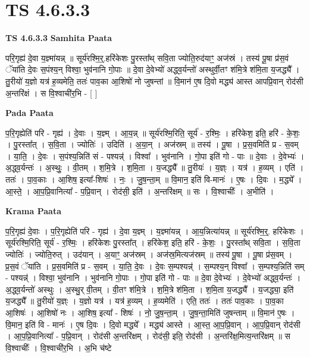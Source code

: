 \documentclass[17pt]{extarticle}
\begin{document}
\section{ TS 4.6.3.3 }

\textbf{TS 4.6.3.3 } \newline
\textbf{Samhita Paata} \newline

परि॒गृह्य॑ दे॒वा य॒ज्ञ्मा॑यन्न् ॥ सूर्य॑रश्मि॒र्॒.हरि॑केशः पु॒रस्ता᳚थ् सवि॒ता ज्योति॒रुद॑याꣳ॒॒ अज॑स्रं । तस्य॑ पू॒षा प्र॑स॒वं ॅया॑ति दे॒वः स॒पंश्य॒न् विश्वा॒ भुव॑नानि गो॒पाः ॥ दे॒वा दे॒वेभ्यो॑ अद्ध्व॒र्यन्तो॑ अस्थुर्वी॒तꣳ श॑मि॒त्रे श॑मि॒ता य॒जद्ध्यै᳚ । तु॒रीयो॑ य॒ज्ञो यत्र॑ ह॒व्यमेति॒ ततः॑ पाव॒का आ॒शिषो॑ नो जुषन्तां ॥ वि॒मान॑ ए॒ष दि॒वो मद्ध्य॑ आस्त आपप्रि॒वान् रोद॑सी अ॒न्तरि॑क्षं । स वि॒श्वाची॑र॒भि - [  ] \newline

\textbf{Pada Paata} \newline

प॒रि॒गृह्येति॑ परि - गृह्य॑ । दे॒वाः । य॒ज्ञ्म् । आ॒य॒न्न् ॥ सूर्य॑रश्मि॒रिति॒ सूर्य॑ - र॒श्मिः॒ । हरि॑केश॒ इति॒ हरि॑ - के॒शः॒ । पु॒रस्ता᳚त् । स॒वि॒ता । ज्योतिः॑ । उदिति॑ । अ॒या॒न् । अज॑स्रम् ॥ तस्य॑ । पू॒षा । प्र॒स॒वमिति॑ प्र - स॒वम् । या॒ति॒ । दे॒वः । स॒पंश्य॒न्निति॑ सं - पश्यन्न्॑ । विश्वा᳚ । भुव॑नानि । गो॒पा इति॑ गो - पाः ॥ दे॒वाः । दे॒वेभ्यः॑ । अ॒द्ध्व॒र्यन्तः॑ । अ॒स्थुः॒ । वी॒तम् । श॒मि॒त्रे । श॒मि॒ता । य॒जद्ध्यै᳚ ॥ तु॒रीयः॑ । य॒ज्ञ्ः । यत्र॑ । ह॒व्यम् । एति॑ । ततः॑ । पा॒व॒काः । आ॒शिष॒ इत्या᳚-शिषः॑ । नः॒ । जु॒ष॒न्ता॒म् ॥ वि॒मान॒ इति॑ वि-मानः॑ । ए॒षः । दि॒वः । म॒द्ध्ये᳚ । आ॒स्ते॒ । आ॒प॒प्रि॒वानित्या᳚ - प॒प्रि॒वान् । रोद॑सी॒ इति॑ । अ॒न्तरि॑क्षम् ॥ सः । वि॒श्वाचीः᳚ । अ॒भीति॑ ।  \newline


\textbf{Krama Paata} \newline

प॒रि॒गृह्य॑ दे॒वाः । प॒रि॒गृह्येति॑ परि - गृह्य॑ । दे॒वा य॒ज्ञ्म् । य॒ज्ञ्मा॑यन्न् । आ॒य॒न्नित्या॑यन्न् ॥ सूर्य॑रश्मि॒र्॒. हरि॑केशः । सूर्य॑रश्मि॒रिति॒ सूर्य॑ - र॒श्मिः॒ । हरि॑केशः पु॒रस्ता᳚त् । हरि॑केश॒ इति॒ हरि॑ - के॒शः॒ । पु॒रस्ता᳚थ् सवि॒ता । स॒वि॒ता ज्योतिः॑ । ज्योति॒रुत् । उद॑यान् । अ॒याꣳ॒॒ अज॑स्रम् । अज॑स्र॒मित्यज॑स्रम् ॥ तस्य॑ पू॒षा । पू॒षा प्र॑स॒वम् । प्र॒स॒वं ॅया॑ति । प्र॒स॒वमिति॑ प्र - स॒वम् । या॒ति॒ दे॒वः । दे॒वः स॒म्पश्यन्न्॑ । स॒म्पश्य॒न् विश्वा᳚ । स॒म्पश्य॒न्निति॑ सम् - पश्यन्न्॑ । विश्वा॒ भुव॑नानि । भुव॑नानि गो॒पाः । गो॒पा इति॑ गो - पाः ॥ दे॒वा दे॒वेभ्यः॑ । दे॒वेभ्यो॑ अद्ध्व॒र्यन्तः॑ । अ॒द्ध्व॒र्यन्तो॑ अस्थुः । अ॒स्थु॒र् वी॒तम् । वी॒तꣳ श॑मि॒त्रे । श॒मि॒त्रे श॑मि॒ता । श॒मि॒ता य॒जद्ध्यै᳚ । य॒जद्ध्या॒ इति॑ य॒जद्ध्यै᳚ ॥ तु॒रीयो॑ य॒ज्ञ्ः । य॒ज्ञो यत्र॑ । यत्र॑ ह॒व्यम् । ह॒व्यमेति॑ । एति॒ ततः॑ । ततः॑ पाव॒काः । पा॒व॒का आ॒शिषः॑ । आ॒शिषो॑ नः । आ॒शिष॒ इत्या᳚ - शिषः॑ । नो॒ जु॒ष॒न्ता॒म् । जु॒ष॒न्ता॒मिति॑ जुषन्ताम् ॥ वि॒मान॑ ए॒षः । वि॒मान॒ इति॑ वि - मानः॑ । ए॒ष दि॒वः । दि॒वो मद्ध्ये᳚ । मद्ध्य॑ आस्ते । आ॒स्त॒ आ॒प॒प्रि॒वान् । आ॒प॒प्रि॒वान् रोद॑सी । आ॒प॒प्रि॒वानित्या᳚ - प॒प्रि॒वान् । रोद॑सी अ॒न्तरि॑क्षम् । रोद॑सी॒ इति॒ रोद॑सी । अ॒न्तरि॑क्ष॒मित्य॒न्तरि॑क्षम् ॥ स वि॒श्वाचीः᳚ । वि॒श्वाची॑र॒भि । अ॒भि च॑ष्टे \newline
\end{document}
